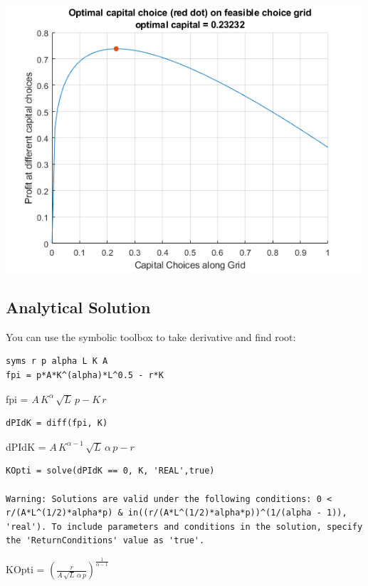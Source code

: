 \documentclass[
]{book}
\begin{document}
\includegraphics[width=5.20833in,height=\textheight]{img/K_borrow_firm_images/figure_0.png}

\hypertarget{analytical-solution-1}{%
\subsection{Analytical Solution}\label{analytical-solution-1}}

You can use the symbolic toolbox to take derivative and find root:

\begin{verbatim}
syms r p alpha L K A
fpi = p*A*K^(alpha)*L^0.5 - r*K
\end{verbatim}

fpi = \(\displaystyle A\,K^{\alpha } \,\sqrt{L}\,p-K\,r\)

\begin{verbatim}
dPIdK = diff(fpi, K)
\end{verbatim}

dPIdK = \(\displaystyle A\,K^{\alpha -1} \,\sqrt{L}\,\alpha \,p-r\)

\begin{verbatim}
KOpti = solve(dPIdK == 0, K, 'REAL',true)

Warning: Solutions are valid under the following conditions: 0 < r/(A*L^(1/2)*alpha*p) & in((r/(A*L^(1/2)*alpha*p))^(1/(alpha - 1)), 'real'). To include parameters and conditions in the solution, specify the 'ReturnConditions' value as 'true'.
\end{verbatim}

KOpti =
\(\displaystyle {{\left(\frac{r}{A\,\sqrt{L}\,\alpha \,p}\right)}}^{\frac{1}{\alpha -1}}\)
\end{document}
